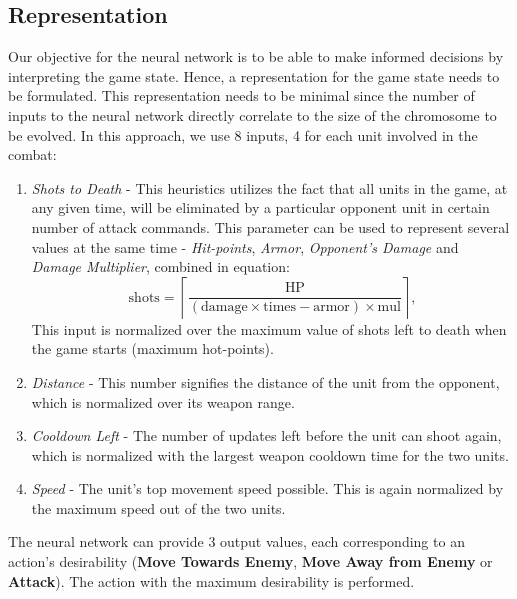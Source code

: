 \subsection{Representation} 
Our objective for the neural network is to be able to make informed decisions by interpreting the game state. Hence, a representation for the game state needs to be formulated. This representation needs to be minimal since the number of inputs to the neural network directly correlate to the size of the chromosome to be evolved. In this approach, we use 8 inputs, 4 for each unit involved in the combat: 
\begin{enumerate}
\item \emph{Shots to Death} - This heuristics utilizes the fact that all units in the game, at any given time, will be eliminated by a particular opponent unit in certain number of attack commands. This parameter can be used to represent several values at the same time - \emph{Hit-points}, \emph{Armor}, \emph{Opponent's Damage} and \emph{Damage Multiplier}, combined in equation:
\begin{equation}
\label{equation:nShots}
\text{shots}=\left \lceil\frac{\text{HP}}{(\text{damage}\times\text{times}-\text{armor}) \times\text{mul}} \right \rceil \text{,}
\end{equation}
This input is normalized over the maximum value of shots left to death when the game starts (maximum hot-points).
\item \emph{Distance} - This number signifies the distance of the unit from the opponent, which is normalized over its weapon range.
\item \emph{Cooldown Left} - The number of updates left before the unit can shoot again, which is normalized with the largest weapon cooldown time for the two units.
\item \emph{Speed} - The unit's top movement speed possible. This is again normalized by the maximum speed out of the two units.
\end{enumerate}
The neural network can provide 3 output values, each corresponding to an action's desirability ({\bf Move Towards Enemy}, {\bf Move Away from Enemy} or {\bf Attack}). The action with the maximum desirability is performed.

